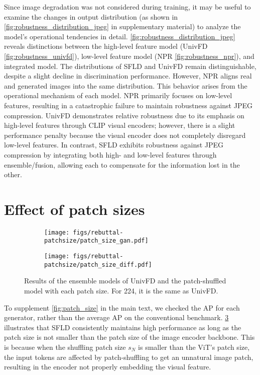 Since image degradation was not considered during training, it may be useful to examine the changes in output distribution (as shown in \cref{fig:robustness_distribution_jpeg} in supplementary material) to analyze the model's operational tendencies in detail.
\cref{fig:robustness_distribution_jpeg} reveals distinctions between the high-level feature model (UnivFD \cref{fig:robustness_univfd}), low-level feature model (NPR \cref{fig:robustness_npr}), and integrated model.
The distributions of SFLD and UnivFD remain distinguishable, despite a slight decline in discrimination performance.
However, NPR aligns real and generated images into the same distribution.
This behavior arises from the operational mechanism of each model.
NPR primarily focuses on low-level features, resulting in a catastrophic failure to maintain robustness against JPEG compression.
UnivFD demonstrates relative robustness due to its emphasis on high-level features through CLIP visual encoders; however, there is a slight performance penalty because the visual encoder does not completely disregard low-level features.
In contrast, SFLD exhibits robustness against JPEG compression by integrating both high- and low-level features through ensemble/fusion, allowing each to compensate for the information lost in the other.


\section{Effect of patch sizes}

\label{sec:supple_patchsize}
\begin{figure}[t]
    \centering
    \begin{subfigure}[t]{0.48\linewidth}
        \centering
        \texttt{[image: figs/rebuttal-patchsize/patch\_size\_gan.pdf]}
        \label{fig:rebuttal-patchsize-gan}
    \end{subfigure}
    \begin{subfigure}[t]{0.48\linewidth}
        \centering
        \texttt{[image: figs/rebuttal-patchsize/patch\_size\_diff.pdf]}
        \label{fig:rebuttal-patchsize-diff}
    \end{subfigure}
    \caption{Results of the ensemble models of UnivFD and the patch-shuffled model with each patch size. For 224, it is the same as UnivFD.}
    \label{fig:rebuttal-patchsize}
\end{figure}
To supplement \cref{fig:patch_size} in the main text, we checked the AP for each generator, rather than the average AP on the conventional benchmark.
\cref{fig:rebuttal-patchsize} illustrates that SFLD consistently maintains high performance as long as the patch size is not smaller than the patch size of the image encoder backbone. 
This is because when the shuffling patch size $s_N$ is smaller than the ViT's patch size, the input tokens are affected by patch-shuffling to get an unnatural image patch, resulting in the encoder not properly embedding the visual feature.


